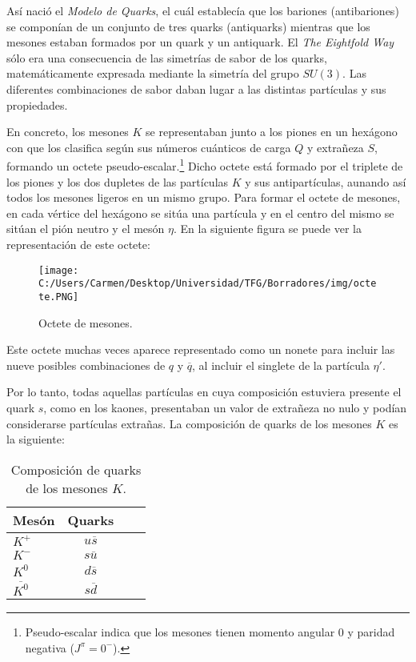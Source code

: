 
Así nació el \textit{Modelo de Quarks}, el cuál establecía que los bariones (antibariones) se componían de un conjunto de tres quarks (antiquarks) mientras que los mesones estaban formados por un quark y un antiquark. El \textit{The Eightfold Way} sólo era una consecuencia de las simetrías de sabor de los quarks, matemáticamente expresada mediante la simetría del grupo $SU(3)$. Las diferentes combinaciones de sabor daban lugar a las distintas partículas y sus propiedades.

En concreto, los mesones $K$ se representaban junto a los piones en un hexágono con que los clasifica según sus números cuánticos de carga $Q$ y extrañeza $S$, formando un octete pseudo-escalar.\footnote{Pseudo-escalar indica que los mesones tienen momento angular 0 y paridad negativa ($J^\pi = 0^-$).} Dicho octete está formado por el triplete de los piones y los dos dupletes de las partículas $K$ y sus antipartículas, aunando así todos los mesones ligeros en un mismo grupo. Para formar el octete de mesones, en cada vértice del hexágono se sitúa una partícula y en el centro del mismo se sitúan el pión neutro y el mesón $\eta$. En la siguiente figura se puede ver la representación de este octete:

\begin{figure}[h]
	\centering
	\texttt{[image: C:/Users/Carmen/Desktop/Universidad/TFG/Borradores/img/octete.PNG]}
	\caption[Octete de mesones]
	{Octete de mesones. \cite{Griffiths2008}}
	\label{fig:octete}
\end{figure}

Este octete muchas veces aparece representado como un nonete para incluir las nueve posibles combinaciones de $q$ y $\overline{q}$, al incluir el singlete de la partícula $\eta'$.

Por lo tanto, todas aquellas partículas en cuya composición estuviera presente el quark $s$, como en los kaones, presentaban un valor de extrañeza no nulo y podían considerarse partículas extrañas. La composición de quarks de los mesones $K$ es la siguiente:

\begin{table}[h]
	\centering
	\begin{tabular}{l*{2}{c}r}
\hline
Mesón & Quarks\\ 
\hline
$K^+$ & $u\overline{s}$\\
$K^-$ & $s\overline{u}$\\
$K^0$ & $d\overline{s}$\\
$\overline{K^0}$ & $s\overline{d}$\\
\hline
	\end{tabular}
\caption{Composición de quarks de los mesones $K$. \cite{notas2020}} 
\label{tab:mesonesK_quarks}
\end{table}

